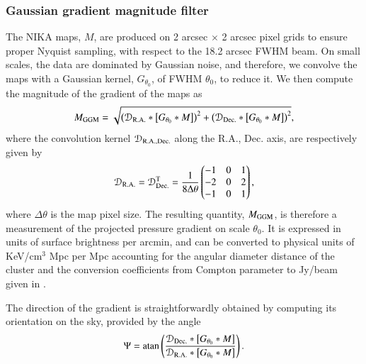 \documentclass[twocolumn,traditabstract]{aa}
\begin{document}
\subsubsection{Gaussian gradient magnitude filter}
The NIKA maps, $M$, are produced on 2 arcsec $\times$ 2 arcsec pixel grids to ensure proper Nyquist sampling, with respect to the 18.2 arcsec FWHM beam. On small scales, the data are dominated by Gaussian noise, and therefore, we convolve the maps with a Gaussian kernel, $G_{\theta_0}$, of FWHM $\theta_0$, to reduce it. We then compute the magnitude of the gradient of the maps as 
\begin{equation}
	M_{\rm GGM} = \sqrt{\left(\mathcal{D}_{\rm R.A.} \ast \left[G_{\theta_0} \ast M\right]\right)^2 + \left(\mathcal{D}_{\rm Dec.} \ast \left[G_{\theta_0} \ast M\right]\right)^2},
	\label{eq:GGM_filter}
\end{equation}
where the convolution kernel $\mathcal{D}_{\rm R.A., Dec.}$ along the R.A., Dec. axis, are respectively given by
\begin{equation}
	\mathcal{D}_{\rm R.A.}= \mathcal{D}_{\rm Dec.}^{\rm T} = \frac{1}{8 \Delta \theta}
	\begin{pmatrix}
	-1 & 0 & 1\\
	-2 & 0 & 2\\
	-1 & 0 & 1
	\end{pmatrix},
	\label{eq:GGM_kernel}
\end{equation}
where $\Delta \theta$ is the map pixel size. The resulting quantity, $M_{\rm GGM}$, is therefore a measurement of the projected pressure gradient on scale $\theta_0$. It is expressed in units of surface brightness per arcmin, and can be converted to physical units of KeV/cm$^3$ Mpc per Mpc accounting for the angular diameter distance of the cluster and the conversion coefficients from Compton parameter to Jy/beam given in \cite{Adam2016b}.

The direction of the gradient is straightforwardly obtained by computing its orientation on the sky, provided by the angle
\begin{equation}
	\Psi = {\rm atan} \left( \frac{\mathcal{D}_{\rm Dec.} \ast \left[G_{\theta_0} \ast M\right]}{\mathcal{D}_{\rm R.A.} \ast \left[G_{\theta_0} \ast M\right]} \right).
	\label{eq:GGM_angle}
\end{equation}

\end{document}

